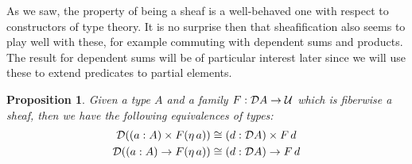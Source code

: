 \documentclass[11pt]{article}
\newtheorem{prop}[thrm]{Proposition}
\begin{document}
As we saw, the property of being a sheaf is a well-behaved one with respect
to constructors of type theory.
%
It is no surprise then that sheafification also seems to play well with these,
for example commuting with dependent sums and products.
%
The result for dependent sums will be of particular interest later since
we will use these to extend predicates to partial elements.

\begin{prop}
  Given a type \(A\) and a family \(F : \mathcal{D}{A} \to \mathcal{U}\) which is
  fiberwise a sheaf, then we have the following equivalences of types:
  \begin{align*}
    \mathcal{D}{({(a : A)}\times{F(\eta\,{a})})}
    &\cong
    {(d : \mathcal{D}{A})}\times{F\,d}
    \\
    \mathcal{D}{({{(a : A)}\to{F(\eta\,{a})}})}
    &\cong
    {{(d : \mathcal{D}{A})}\to{F\,d}}
  \end{align*}
\end{prop}
\end{document}
